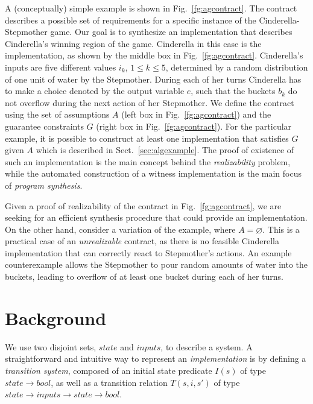 A (conceptually) simple example is shown in Fig.~\ref{fg:agcontract}. The contract describes a possible set of requirements for a specific instance of the Cinderella-Stepmother game. %
Our goal is to synthesize an implementation that describes Cinderella's winning region of the game. Cinderella in this case is the implementation, as shown by the middle box in Fig.~\ref{fg:agcontract}. Cinderella's inputs are five different values $i_k$, $1 \leq k \leq 5$, determined by a random distribution of one unit of water by the Stepmother. During each of her turns Cinderella has to make a choice denoted by the output variable $e$, such that the buckets $b_k$ do not overflow during the next action of her Stepmother. We define the contract using the set of assumptions $A$ (left box in Fig.~\ref{fg:agcontract}) and the guarantee constraints $G$ (right box in Fig.~\ref{fg:agcontract}). For the particular example, it is possible to construct at least one implementation that satisfies $G$ given $A$ which is described in Sect.~\ref{sec:algexample}.
The proof of existence of such an implementation is the main concept behind the \emph{realizability} problem, while the automated construction of a witness implementation is the main focus of \emph{program synthesis}.

Given a proof of realizability of the contract in Fig.~\ref{fg:agcontract}, %
we are seeking for an efficient synthesis procedure that could provide an implementation.
On the other hand, consider a variation of the example, where $A = \varnothing$. This is a practical case of an
\emph{unrealizable} contract, as there is no feasible Cinderella implementation that can correctly react to Stepmother's actions. An example counterexample allows the Stepmother to pour random amounts of water into the buckets, leading to overflow of at least one bucket during each of her turns.

\section{Background}
\label{sec:background}
We use two disjoint sets, $state$ and $inputs$, to describe a system.
A straightforward and intuitive way to represent an \emph{implementation} is by
defining a \emph{transition system}, composed of an initial state
predicate $I(s)$ of type $state \to bool$, as well as a transition relation
$T(s,i,s')$ of type $state \to inputs \to state \to bool$.

